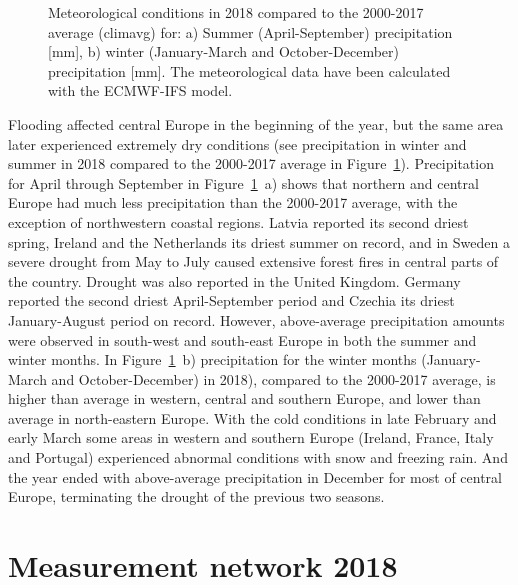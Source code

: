 \begin{figure}[H]
  \centering
  \caption{Meteorological conditions in 2018 compared to the 2000-2017 average (climavg) for: a) Summer (April-September) precipitation [mm], b) winter (January-March and October-December) precipitation [mm]. The meteorological data have been calculated with the ECMWF-IFS model.} 
\label{fig:prec2017-avMET}
\end{figure}

Flooding affected central Europe in the beginning of the year, but the same area later experienced extremely dry conditions (see precipitation in winter and summer in 2018 compared to the 2000-2017 average in Figure~\ref{fig:prec2017-avMET}). Precipitation for April through September in Figure~\ref{fig:prec2017-avMET}~a) shows that northern and central Europe had much less precipitation than the 2000-2017 average, with the exception of northwestern coastal regions. Latvia reported its second driest spring, Ireland and the Netherlands its driest summer on record, and in Sweden a severe drought from May to July caused extensive forest fires in central parts of the country. Drought was also reported in the United Kingdom. Germany reported the second driest April-September period and Czechia its driest January-August period on record.
However, above-average precipitation amounts were observed in south-west and south-east Europe in both the summer and winter months. In Figure~\ref{fig:prec2017-avMET}~b) precipitation for the winter months (January-March and October-December) in 2018), compared to the 2000-2017 average, is higher than average in western, central and southern Europe, and lower than average in north-eastern Europe. With the cold conditions in late February and early March some areas in western and southern Europe (Ireland, France, Italy and Portugal) experienced abnormal conditions with snow and freezing rain. And the year ended with above-average precipitation in December for most of central Europe, terminating the drought of the previous two seasons.


\section{Measurement network 2018} 
\label{Obs_2018}

